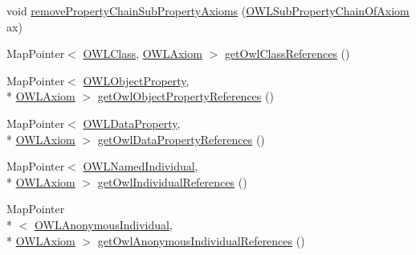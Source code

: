 \begin{DoxyCompactItemize}
\item 
void \hyperlink{classuk_1_1ac_1_1manchester_1_1cs_1_1owl_1_1owlapi_1_1_internals_impl_aa9e10b831f427835e0b88b14e6a454d0}{remove\-Property\-Chain\-Sub\-Property\-Axioms} (\hyperlink{interfaceorg_1_1semanticweb_1_1owlapi_1_1model_1_1_o_w_l_sub_property_chain_of_axiom}{O\-W\-L\-Sub\-Property\-Chain\-Of\-Axiom} ax)
\item 
Map\-Pointer$<$ \hyperlink{interfaceorg_1_1semanticweb_1_1owlapi_1_1model_1_1_o_w_l_class}{O\-W\-L\-Class}, \hyperlink{interfaceorg_1_1semanticweb_1_1owlapi_1_1model_1_1_o_w_l_axiom}{O\-W\-L\-Axiom} $>$ \hyperlink{classuk_1_1ac_1_1manchester_1_1cs_1_1owl_1_1owlapi_1_1_internals_impl_a024ca7ce7cb3f137524c797af6e87837}{get\-Owl\-Class\-References} ()
\item 
Map\-Pointer$<$ \hyperlink{interfaceorg_1_1semanticweb_1_1owlapi_1_1model_1_1_o_w_l_object_property}{O\-W\-L\-Object\-Property}, \\*
\hyperlink{interfaceorg_1_1semanticweb_1_1owlapi_1_1model_1_1_o_w_l_axiom}{O\-W\-L\-Axiom} $>$ \hyperlink{classuk_1_1ac_1_1manchester_1_1cs_1_1owl_1_1owlapi_1_1_internals_impl_aeb644c651fa6fce4e76f2b1f97f9a28d}{get\-Owl\-Object\-Property\-References} ()
\item 
Map\-Pointer$<$ \hyperlink{interfaceorg_1_1semanticweb_1_1owlapi_1_1model_1_1_o_w_l_data_property}{O\-W\-L\-Data\-Property}, \\*
\hyperlink{interfaceorg_1_1semanticweb_1_1owlapi_1_1model_1_1_o_w_l_axiom}{O\-W\-L\-Axiom} $>$ \hyperlink{classuk_1_1ac_1_1manchester_1_1cs_1_1owl_1_1owlapi_1_1_internals_impl_a13ea5b97b8db44203e974c50ad145f61}{get\-Owl\-Data\-Property\-References} ()
\item 
Map\-Pointer$<$ \hyperlink{interfaceorg_1_1semanticweb_1_1owlapi_1_1model_1_1_o_w_l_named_individual}{O\-W\-L\-Named\-Individual}, \\*
\hyperlink{interfaceorg_1_1semanticweb_1_1owlapi_1_1model_1_1_o_w_l_axiom}{O\-W\-L\-Axiom} $>$ \hyperlink{classuk_1_1ac_1_1manchester_1_1cs_1_1owl_1_1owlapi_1_1_internals_impl_afd1304683cb34b3218cc9d454ae59a57}{get\-Owl\-Individual\-References} ()
\item 
Map\-Pointer\\*
$<$ \hyperlink{interfaceorg_1_1semanticweb_1_1owlapi_1_1model_1_1_o_w_l_anonymous_individual}{O\-W\-L\-Anonymous\-Individual}, \\*
\hyperlink{interfaceorg_1_1semanticweb_1_1owlapi_1_1model_1_1_o_w_l_axiom}{O\-W\-L\-Axiom} $>$ \hyperlink{classuk_1_1ac_1_1manchester_1_1cs_1_1owl_1_1owlapi_1_1_internals_impl_a09ed348d25c31439d4da10553f0b0f9a}{get\-Owl\-Anonymous\-Individual\-References} ()

\end{DoxyCompactItemize}
